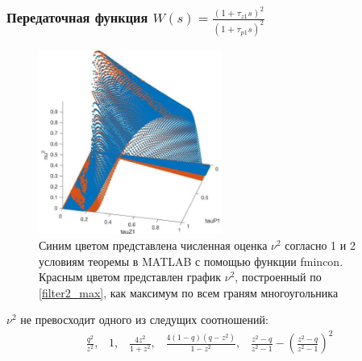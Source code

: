 \documentclass{beamer}
\begin{document}
\begin{frame}
\frametitle{Передаточная функция $W(s) = \frac{(1+\tau_{z1}s)^2}{(1+\tau_{p1}s)^2}$}
  \begin{figure}[H] 
  \includegraphics[width=6cm]{images/main.eps}
\caption{Синим цветом представлена численная оценка $\nu^2$ согласно 1 и 2 условиям теоремы в MATLAB с помощью функции fmincon. Красным цветом представлен график $\nu^2$, построенный по \eqref{filter2_max}, как максимум по всем граням многоугольника}\vspace{-2mm}
\end{figure}
$\nu^2$ не превосходит одного из следущих соотношений:
\vspace{-2mm}
 \begin{equation}\label{filter2_max}
\begin{aligned}
\frac{q^2}{z^2}\text{,} \quad 1 \text{,} \quad \frac{4z^2}{1+z^2} \text{,} \quad \frac{4(1-q)(q-z^2)}{1-z^2} \text{,} \quad \frac{z^2-q}{z^2-1} - \left(\frac{z^2-q}{z^2-1}\right)^2
\end{aligned}
\end{equation}
\end{frame}

\end{document}
